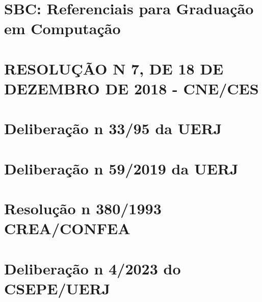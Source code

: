 \chapter{SBC: Referenciais para Graduação em Computação}
\label{sbc2017}

\chapter{RESOLUÇÃO N\textordmasculine{} 7, DE 18 DE DEZEMBRO DE 2018 - CNE/CES}
\label{rcne2018}

\chapter{Deliberação n\textordmasculine{} 33/95 da UERJ}
\label{delib3395}

\chapter{Deliberação n\textordmasculine{} 59/2019 da UERJ}
\label{delib592019}

\chapter{Resolução n\textordmasculine{} 380/1993 CREA/CONFEA}
\label{confea1993}

\chapter{Deliberação n\textordmasculine{} 4/2023 do CSEPE/UERJ}
\label{del4}

